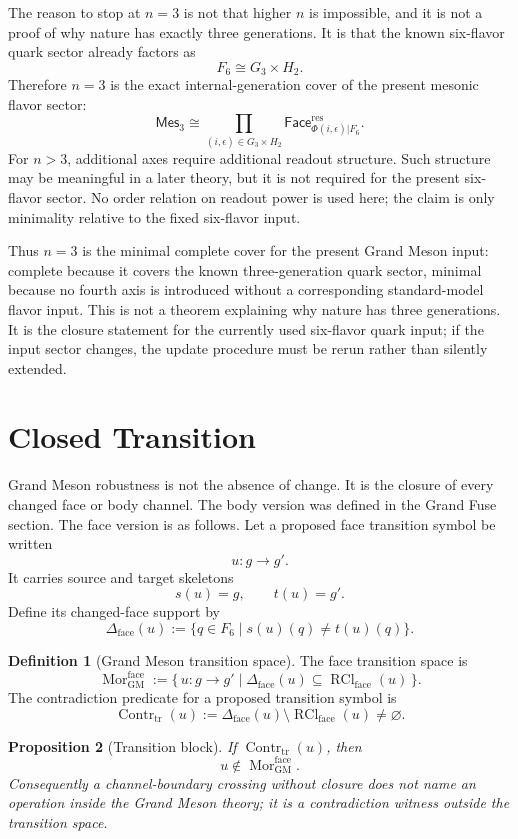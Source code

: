 \documentclass[11pt]{article}
\theoremstyle{definition}
\newtheorem{definition}{Definition}
\theoremstyle{plain}
\newtheorem{proposition}[definition]{Proposition}
\DeclareMathOperator{\Contr}{Contr}
\DeclareMathOperator{\Mor}{Mor}
\DeclareMathOperator{\RCl}{RCl}
\begin{document}
The reason to stop at \(n=3\) is not that higher \(n\) is impossible, and
it is not a proof of why nature has exactly three generations.  It is that
the known six-flavor quark sector already factors as
\[
  F_6\cong G_3\times H_2 .
\]
Therefore \(n=3\) is the exact internal-generation cover of the present
mesonic flavor sector:
\[
  \mathsf{Mes}_3
  \cong
  \prod_{(i,\epsilon)\in G_3\times H_2}
  \mathsf{Face}^{\mathrm{res}}_{\Phi(i,\epsilon)|F_6}.
\]
For \(n>3\), additional axes require additional readout structure.  Such
structure may be meaningful in a later theory, but it is not required for
the present six-flavor sector.  No order relation on readout power is used
here; the claim is only minimality relative to the fixed six-flavor input.

Thus \(n=3\) is the minimal complete cover for the present Grand Meson
input: complete because it covers the known three-generation quark sector,
minimal because no fourth axis is introduced without a corresponding
standard-model flavor input.  This is not a theorem explaining why nature
has three generations.  It is the closure statement for the currently used
six-flavor quark input; if the input sector changes, the update procedure
must be rerun rather than silently extended.

\section{Closed Transition}

Grand Meson robustness is not the absence of change.  It is the closure of
every changed face or body channel.  The body version was defined in the
Grand Fuse section.  The face version is as follows.  Let a proposed face
transition symbol be written
\[
  u:g\to g'.
\]
It carries source and target skeletons
\[
  s(u)=g,\qquad t(u)=g'.
\]
Define its changed-face support by
\[
  \Delta_{\mathrm{face}}(u)
  :=
  \{q\in F_6\mid s(u)(q)\ne t(u)(q)\}.
\]

\begin{definition}[Grand Meson transition space]
The face transition space is
\[
  \Mor^{\mathrm{face}}_{\mathrm{GM}}
  :=
  \{\,u:g\to g'
  \mid
  \Delta_{\mathrm{face}}(u)\subseteq\RCl_{\mathrm{face}}(u)\,\}.
\]
The contradiction predicate for a proposed transition symbol is
\[
  \Contr_{\mathrm{tr}}(u)
  :=
  \Delta_{\mathrm{face}}(u)\setminus\RCl_{\mathrm{face}}(u)
  \ne\varnothing .
\]
\end{definition}

\begin{proposition}[Transition block]
If \(\Contr_{\mathrm{tr}}(u)\), then
\[
  u\notin\Mor^{\mathrm{face}}_{\mathrm{GM}}.
\]
Consequently a channel-boundary crossing without closure does not name an
operation inside the Grand Meson theory; it is a contradiction witness
outside the transition space.
\end{proposition}
\end{document}
